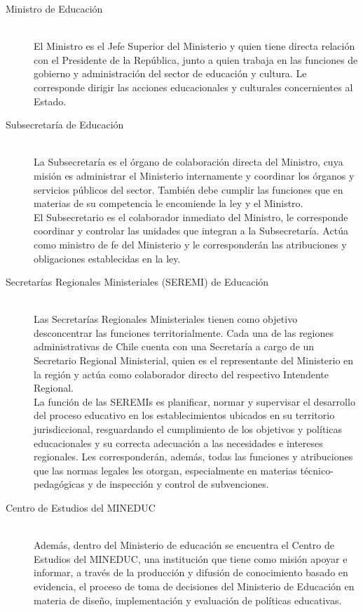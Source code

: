 \begin{description}
\item[Ministro de Educación] \hfill \\
El Ministro es el Jefe Superior del Ministerio y quien tiene directa relación con el Presidente de la República, junto a quien trabaja en las funciones de gobierno y administración del sector de educación y cultura.
Le corresponde dirigir las acciones educacionales y culturales concernientes al Estado.
\item[Subsecretaría de Educación] \hfill \\
La Subsecretaría es el órgano de colaboración directa del Ministro, cuya misión es administrar el Ministerio internamente y coordinar los órganos y servicios públicos del sector. También debe cumplir las funciones que en materias de su competencia le encomiende la ley y el Ministro. \\
El Subsecretario es el colaborador inmediato del Ministro, le corresponde coordinar y controlar las unidades que integran a la Subsecretaría. Actúa como ministro de fe del Ministerio y le corresponderán las atribuciones y obligaciones establecidas en la ley.
\item[Secretarías Regionales Ministeriales (SEREMI) de Educación] \hfill \\
Las Secretarías Regionales Ministeriales tienen como objetivo desconcentrar las funciones territorialmente. Cada una de las regiones administrativas de Chile cuenta con una Secretaría a cargo de un Secretario Regional Ministerial, quien es el representante del Ministerio en la región y actúa como colaborador directo del respectivo Intendente Regional.\\
La función de las SEREMIs es planificar, normar y supervisar el desarrollo del proceso educativo en los establecimientos ubicados en su territorio jurisdiccional, resguardando el cumplimiento de los objetivos y políticas educacionales y su correcta adecuación a las necesidades e intereses regionales. Les corresponderán, además, todas las funciones y atribuciones que las normas legales les otorgan, especialmente en materias técnico-pedagógicas y de inspección y control de subvenciones. 
\end{description}

\newpage

\begin{description}
\item[Centro de Estudios del MINEDUC] \hfill \\
Además, dentro del Ministerio de educación se encuentra el Centro de Estudios del MINEDUC, una institución que tiene como misión apoyar e informar, a través de la producción y difusión de conocimiento basado en evidencia, el proceso de toma de decisiones del Ministerio de Educación en materia de diseño, implementación y evaluación de políticas educativas. \cite{centroestudios}
\end{description}

